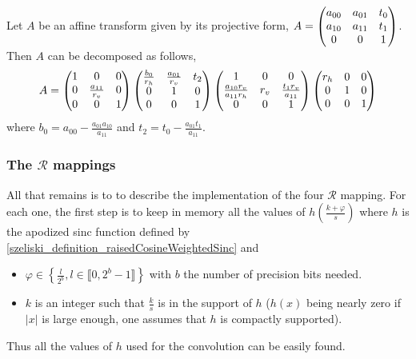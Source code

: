 		\begin{prop}
		\label{propositionDecompositionAffinite}
		Let $A$ be an affine transform given by its projective form, $A = \begin{pmatrix} a_{00} & a_{01} & t_0\\ a_{10} & a_{11} & t_1\\ 0&0&1 \end{pmatrix}$. Then $A$ can be decomposed as follows,
		\[
			A = 
			\begin{pmatrix} 1 & 0 & 0\\ 0 & \frac{a_{11}}{r_v} & 0\\ 0 & 0 & 1 \end{pmatrix}
			\begin{pmatrix} \frac{b_{0}}{r_h} & \frac{a_{01}}{r_v} & t_2\\ 0 & 1 & 0\\ 0 & 0 & 1 \end{pmatrix}
			\begin{pmatrix} 1 & 0 & 0\\ \frac{a_{10}r_v}{a_{11}r_h} & r_v & \frac{t_1r_v}{a_{11}}\\ 0 & 0 & 1 \end{pmatrix}
			\begin{pmatrix} r_h & 0 & 0\\ 0 & 1 & 0\\ 0 & 0 & 1 \end{pmatrix}
		\]
where $b_0 = a_{00} - \frac{a_{01}a_{10}}{a_{11}}$ and $t_2 = t_0 - \frac{a_{01}t_1}{a_{11}}$.
\end{prop}
	\subsubsection{The $\mathcal R$ mappings}
		
		All that remains is to to describe the implementation of the four $\mathcal R$ mapping. For each one, the first step is to keep in memory all the values of $h(\frac{k+\varphi}{s})$ where $h$ is the  apodized sinc function defined by \eqref{szeliski_definition_raisedCosineWeightedSinc} and

		
\begin{itemize}
		\item $\varphi \in  \left\lbrace\frac{l}{2^b}, l \in \llbracket 0,2^b-1\rrbracket \right\rbrace$ with $b$ the number of precision bits needed.
		\item $k$ is an integer such that $\frac{k}{s}$ is in the support of $h$ ($h(x)$ being nearly zero if $|x|$ is large enough, one assumes that $h$ is compactly supported).
		\end{itemize}
		Thus all the values of $h$ used for the convolution can be easily found.



